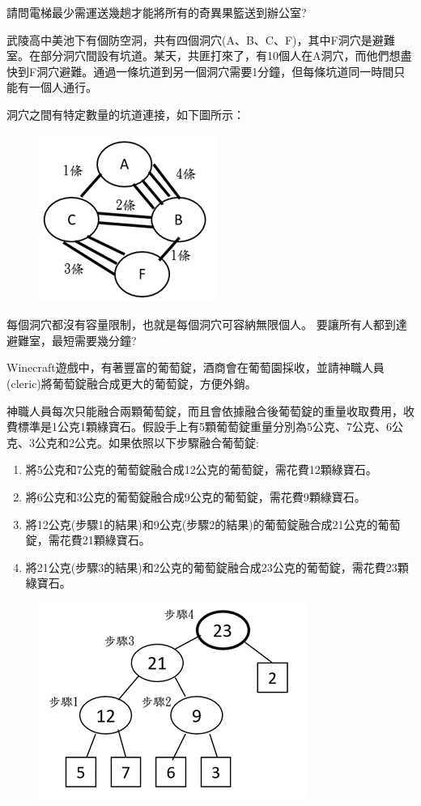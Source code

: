 \documentclass[a4paper, 12pt, addpoints]{exam}
\begin{document}
\begin{questions}
    請問電梯最少需運送幾趟才能將所有的奇異果籃送到辦公室?

    \question[4]
    武陵高中美池下有個防空洞，共有四個洞穴(A、B、C、F)，其中F洞穴是避難室。在部分洞穴間設有坑道。某天，共匪打來了，有10個人在A洞穴，而他們想盡快到F洞穴避難。通過一條坑道到另一個洞穴需要1分鐘，但每條坑道同一時間只能有一個人通行。

    洞穴之間有特定數量的坑道連接，如下圖所示：
    \begin{figure}[H]
        \centerline{\includegraphics{fig/cave.png}}
    \end{figure}


    每個洞穴都沒有容量限制，也就是每個洞穴可容納無限個人。
    要讓所有人都到達避難室，最短需要幾分鐘?

    \question[4]
    Winecraft遊戲中，有著豐富的葡萄錠，酒商會在葡萄園採收，並請神職人員(cleric)將葡萄錠融合成更大的葡萄錠，方便外銷。

    神職人員每次只能融合兩顆葡萄錠，而且會依據融合後葡萄錠的重量收取費用，收費標準是1公克1顆綠寶石。假設手上有5顆葡萄錠重量分別為5公克、7公克、6公克、3公克和2公克。如果依照以下步驟融合葡萄錠:
    \begin{enumerate}
        \item 將5公克和7公克的葡萄錠融合成12公克的葡萄錠，需花費12顆綠寶石。
        \item 將6公克和3公克的葡萄錠融合成9公克的葡萄錠，需花費9顆綠寶石。
        \item 將12公克(步驟1的結果)和9公克(步驟2的結果)的葡萄錠融合成21公克的葡萄錠，需花費21顆綠寶石。
        \item 將21公克(步驟3的結果)和2公克的葡萄錠融合成23公克的葡萄錠，需花費23顆綠寶石。
    \end{enumerate}
    \begin{figure}[H]
        \centerline{\includegraphics{fig/wine.png}}
    \end{figure}



\end{questions}
\end{document}
